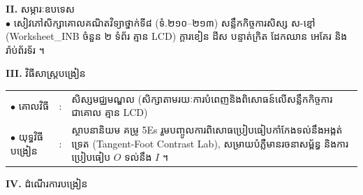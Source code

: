 \documentclass[a4paper,10pt]{article}
\newcommand{\en}[1]{{\TimesEn #1}}
\begin{document}
{%
\textbf{II.} {\muol សម្ភារៈឧបទេស}\\[1pt]
\hspace*{0.55cm}$\bullet$ \hspace{0.35cm} សៀវភៅសិក្សាគោលគណិតវិទ្យាថ្នាក់ទី៨ (ទំ.២១០--២១៣) សន្លឹកកិច្ចការសិស្ស ស-ខ្មៅ (\en{Worksheet\_INB} ចំនួន ២ ទំព័រ គ្មាន \en{LCD}) ក្ដារខៀន ដីស បន្ទាត់ក្រិត ដែកឈាន អេគែរ និងរ៉ាប់ព័រទ័រ ។

\vspace{2pt}

\textbf{III.} {\muol វិធីសាស្រ្តបង្រៀន}\\[1pt]
\hspace*{0.45cm}%
\begin{tabular}{@{}l l L{14.85cm}@{}}
  $\bullet$ \hspace{0.25cm} គោលវិធី & : & សិស្សមជ្ឈមណ្ឌល (សិក្សាតាមរយៈការបំពេញនិងពិសោធន៍លើសន្លឹកកិច្ចការជាគោល គ្មាន \en{LCD}) \\
  $\bullet$ \hspace{0.25cm} យុទ្ធវិធីបង្រៀន & : & ស្ថាបនានិយម គម្រូ \en{5Es} រួមបញ្ចូលការពិសោធប្រៀបធៀបកាំកែងទល់នឹងអង្កត់ទ្រេត (\en{Tangent-Foot Contrast Lab}), សម្រាយបំភ្លឺមានរចនាសម្ព័ន្ធ និងការប្រៀបធៀប $O$ ទល់នឹង $I$ ។ \\
\end{tabular}
}

\vspace{2pt}

\textbf{IV.} {\muol ដំណើរការបង្រៀន}

\vspace{1pt}
\end{document}
